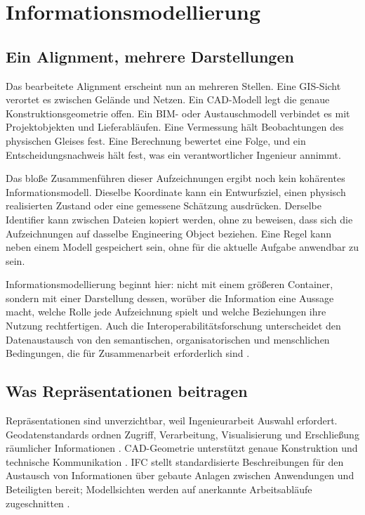
\chapter{Informationsmodellierung}
\label{chap:information-modelling}

\section{Ein Alignment, mehrere Darstellungen}

Das bearbeitete Alignment erscheint nun an mehreren Stellen. Eine GIS-Sicht
verortet es zwischen Gelände und Netzen. Ein CAD-Modell legt die genaue
Konstruktionsgeometrie offen. Ein BIM- oder Austauschmodell verbindet es mit
Projektobjekten und Lieferabläufen. Eine Vermessung hält Beobachtungen des
physischen Gleises fest. Eine Berechnung bewertet eine Folge, und ein
Entscheidungsnachweis hält fest, was ein verantwortlicher Ingenieur annimmt.

Das bloße Zusammenführen dieser Aufzeichnungen ergibt noch kein kohärentes
Informationsmodell. Dieselbe Koordinate kann ein Entwurfsziel, einen physisch
realisierten Zustand oder eine gemessene Schätzung ausdrücken. Derselbe
Identifier kann zwischen Dateien kopiert werden, ohne zu beweisen, dass sich
die Aufzeichnungen auf dasselbe Engineering Object beziehen. Eine Regel kann
neben einem Modell gespeichert sein, ohne für die aktuelle Aufgabe anwendbar
zu sein.

Informationsmodellierung beginnt hier: nicht mit einem größeren Container,
sondern mit einer Darstellung dessen, worüber die Information eine Aussage
macht, welche Rolle jede Aufzeichnung spielt und welche Beziehungen ihre
Nutzung rechtfertigen. Auch die Interoperabilitätsforschung unterscheidet den
Datenaustausch von den semantischen, organisatorischen und menschlichen
Bedingungen, die für Zusammenarbeit erforderlich sind
\cite{Turk2020Interoperability}.

\section{Was Repräsentationen beitragen}

Repräsentationen sind unverzichtbar, weil Ingenieurarbeit Auswahl erfordert.
Geodatenstandards ordnen Zugriff, Verarbeitung, Visualisierung und
Erschließung räumlicher Informationen \cite{OGCStandardsProgram2025}.
CAD-Geometrie unterstützt genaue Konstruktion und technische Kommunikation
\cite{KimKumarSnider2015Geometry}. IFC stellt standardisierte
Beschreibungen für den Austausch von Informationen über gebaute Anlagen
zwischen Anwendungen und Beteiligten bereit; Modellsichten werden auf
anerkannte Arbeitsabläufe zugeschnitten
\cite{BuildingSMARTIFC4x3Scope}.

